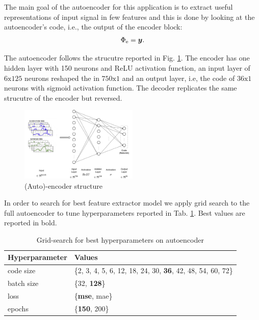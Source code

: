 The main goal of the autoencoder for this application is to extract
useful representations of input signal in few features and this is
done by looking at the autoencoder's code, i.e., the output of the
encoder block:
\begin{equation}
  \Phi_{\text{e}} = \boldsymbol{y}.
\end{equation}

The autoencoder follows the strucutre reported in
Fig. \ref{fig:encoder-structure}. The encoder has one hidden layer
with 150 neurons and ReLU activation function, an input layer of
$6\text{x}125$ neurons reshaped the in $750\text{x}1$ and an output
layer, i.e, the code of $36\text{x}1$ neurons with sigmoid activation
function. The decoder replicates the same strucutre of the encoder but
reversed.
\begin{figure}[h]
  \includegraphics[width=0.5\textwidth]{images/encoder.jpg}
  \caption{(Auto)-encoder structure}
  \label{fig:encoder-structure}
\end{figure}
In order to search for best feature extractor model we apply grid
search to the full autoencoder to tune hyperparameters reported in
Tab. \ref{tab:ae-hyperparams}. Best values are reported in bold.
\begin{table}
  \centering
  \begin{tabular}{lp{4cm}}
    \hline
    Hyperparameter & Values \\
    \hline
    code size & \{2, 3, 4, 5, 6, 12, 18, 24, 30, \textbf{36}, 42, 48, 54, 60, 72\} \\
    batch size & \{32, \textbf{128}\} \\
    loss & \{\textbf{mse}, mae\} \\
    epochs & \{\textbf{150}, 200\} \\
    \hline
  \end{tabular}
  \caption{Grid-search for best hyperparameters on autoencoder}
  \label{tab:ae-hyperparams}
\end{table}

